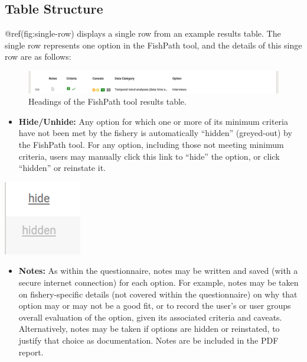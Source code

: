 \documentclass[11pt,]{book}
\providecommand{\tightlist}{%
  \setlength{\itemsep}{0pt}\setlength{\parskip}{0pt}}
\begin{document}
\hypertarget{table-structure}{%
\subsection{Table Structure}\label{table-structure}}

@ref(fig:single-row) displays a single row from an example results
table. The single row represents one option in the FishPath tool, and
the details of this singe row are as follows:

\begin{figure}

{\centering \includegraphics[width=0.95\linewidth]{images/single-row} 

}

\caption{Headings of the FishPath tool results table.}\label{fig:single-row}
\end{figure}

\begin{itemize}
\tightlist
\item
  \textbf{Hide/Unhide:} Any option for which one or more of its minimum
  criteria have not been met by the fishery is automatically ``hidden''
  (greyed-out) by the FishPath tool. For any option, including those not
  meeting minimum criteria, users may manually click this link to
  ``hide'' the option, or click ``hidden'' or reinstate it.
\end{itemize}

\begin{center}\includegraphics[width=0.1\linewidth]{images/hide} \end{center}

\begin{itemize}
\tightlist
\item
  \textbf{Notes:} As within the questionnaire, notes may be written and
  saved (with a secure internet connection) for each option. For
  example, notes may be taken on fishery-specific details (not covered
  within the questionnaire) on why that option may or may not be a good
  fit, or to record the user's or user groups overall evaluation of the
  option, given its associated criteria and caveats. Alternatively,
  notes may be taken if options are hidden or reinstated, to justify
  that choice as documentation. Notes are be included in the PDF report.
\end{itemize}
\end{document}

